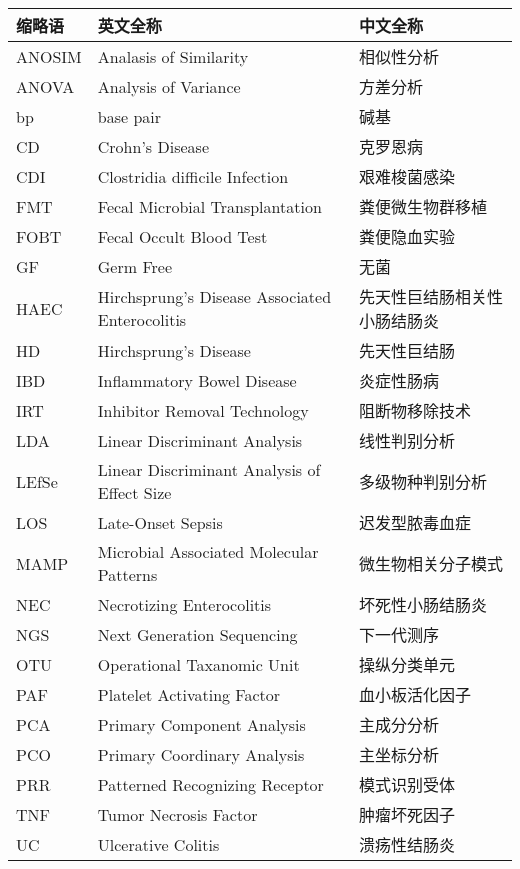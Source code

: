 \begin{nomenclaturename}
\begin{longtable}{llp{3cm}}
  \toprule
  缩略语 & 英文全称 & 中文全称 \\
  \midrule
    ANOSIM & Analasis of Similarity & 相似性分析\\
    ANOVA & Analysis of Variance & 方差分析\\
    bp & base pair & 碱基\\
    CD & Crohn’s Disease & 克罗恩病\\
    CDI &	Clostridia difficile Infection & 艰难梭菌感染\\
    FMT & Fecal Microbial Transplantation & 粪便微生物群移植\\
    FOBT & Fecal Occult Blood Test & 粪便隐血实验\\
    GF & Germ Free & 无菌\\
    HAEC & Hirchsprung’s Disease Associated Enterocolitis & 先天性巨结肠相关性小肠结肠炎\\
    HD & Hirchsprung’s Disease & 先天性巨结肠\\
    IBD & Inflammatory Bowel Disease & 炎症性肠病\\
    IRT & Inhibitor Removal Technology & 阻断物移除技术\\
    LDA & Linear Discriminant Analysis & 线性判别分析\\
    LEfSe & Linear Discriminant Analysis of Effect Size & 多级物种判别分析\\
    LOS & Late-Onset Sepsis & 迟发型脓毒血症\\
    MAMP & Microbial Associated Molecular Patterns & 微生物相关分子模式\\
    NEC & Necrotizing Enterocolitis & 坏死性小肠结肠炎\\
    NGS & Next Generation Sequencing & 下一代测序\\
    OTU & Operational Taxanomic Unit & 操纵分类单元\\
    PAF & Platelet Activating Factor & 血小板活化因子\\
    PCA & Primary Component Analysis & 主成分分析\\
    PCO & Primary Coordinary Analysis & 主坐标分析\\
    PRR & Patterned Recognizing Receptor & 模式识别受体\\
    TNF & Tumor Necrosis Factor & 肿瘤坏死因子\\
    UC & Ulcerative Colitis & 溃疡性结肠炎 \\
    \bottomrule
\end{longtable}


\end{nomenclaturename}
